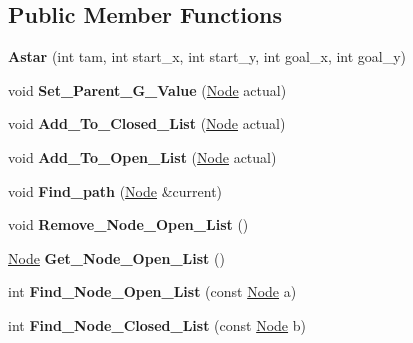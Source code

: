 \subsection*{Public Member Functions}
\begin{DoxyCompactItemize}
\item 
\hypertarget{class_astar_aefad6a17cda946cd45c5e5027489934b}{{\bfseries Astar} (int tam, int start\+\_\+x, int start\+\_\+y, int goal\+\_\+x, int goal\+\_\+y)}\label{class_astar_aefad6a17cda946cd45c5e5027489934b}

\item 
\hypertarget{class_astar_a52886c312f2f7b27aed52843768cf8c2}{void {\bfseries Set\+\_\+\+Parent\+\_\+\+G\+\_\+\+Value} (\hyperlink{class_node}{Node} actual)}\label{class_astar_a52886c312f2f7b27aed52843768cf8c2}

\item 
\hypertarget{class_astar_ab748b97eb928002c29259b1c9a3d7347}{void {\bfseries Add\+\_\+\+To\+\_\+\+Closed\+\_\+\+List} (\hyperlink{class_node}{Node} actual)}\label{class_astar_ab748b97eb928002c29259b1c9a3d7347}

\item 
\hypertarget{class_astar_a27e5c51c01c59b6a2a8b940d86803a14}{void {\bfseries Add\+\_\+\+To\+\_\+\+Open\+\_\+\+List} (\hyperlink{class_node}{Node} actual)}\label{class_astar_a27e5c51c01c59b6a2a8b940d86803a14}

\item 
\hypertarget{class_astar_a65758f9edc318accb69162dde384b970}{void {\bfseries Find\+\_\+path} (\hyperlink{class_node}{Node} \&current)}\label{class_astar_a65758f9edc318accb69162dde384b970}

\item 
\hypertarget{class_astar_aa8a2361e27946f15951cbc64d194aeb0}{void {\bfseries Remove\+\_\+\+Node\+\_\+\+Open\+\_\+\+List} ()}\label{class_astar_aa8a2361e27946f15951cbc64d194aeb0}

\item 
\hypertarget{class_astar_a5b6e55b61c0ab7a61ddb34cad145cf8e}{\hyperlink{class_node}{Node} {\bfseries Get\+\_\+\+Node\+\_\+\+Open\+\_\+\+List} ()}\label{class_astar_a5b6e55b61c0ab7a61ddb34cad145cf8e}

\item 
\hypertarget{class_astar_a99b6a25688450de001e23aabe1068058}{int {\bfseries Find\+\_\+\+Node\+\_\+\+Open\+\_\+\+List} (const \hyperlink{class_node}{Node} a)}\label{class_astar_a99b6a25688450de001e23aabe1068058}

\item 
\hypertarget{class_astar_a2f540a660bbc37fb6fb092d65a9485d5}{int {\bfseries Find\+\_\+\+Node\+\_\+\+Closed\+\_\+\+List} (const \hyperlink{class_node}{Node} b)}\label{class_astar_a2f540a660bbc37fb6fb092d65a9485d5}

\end{DoxyCompactItemize}

